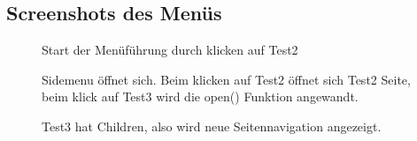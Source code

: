 \subsection{Screenshots des Menüs}
\label{Screenshots des Menüs}
\begin{figure}[htb]
\centering
{}
\caption{Start der Menüführung durch klicken auf Test2}
\end{figure}
\begin{figure}[htb]
\centering
{}
\caption{Sidemenu öffnet sich. Beim klicken auf Test2 öffnet sich Test2 Seite, beim klick auf Test3 wird die open() Funktion angewandt.}
\end{figure}
\begin{figure}[htb]
\centering
{}
\caption{Test3 hat Children, also wird neue Seitennavigation angezeigt.}
\end{figure}
\clearpage
